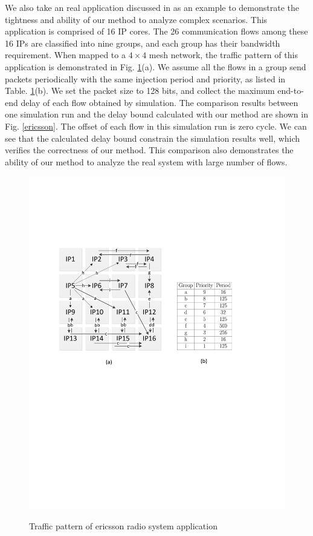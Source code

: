 \documentclass[preprint]{elsarticle}
\begin{document}
We also take an real application discussed in \cite{LuJa08}\cite{Jafari1922089} as an example to demonstrate the tightness and ability of our method to analyze complex scenarios. This application is comprised of 16 IP cores. The 26 communication flows among these 16 IPs are classified into nine groups, and each group has their bandwidth requirement. When mapped to a $4\times 4$ mesh network, the traffic pattern of this application is demonstrated in Fig. \ref{trafficpattern}(a). We assume all the flows in a group send packets periodically with the same injection period and priority, as listed in Table. \ref{trafficpattern}(b). We set the packet size to 128 bits, and collect the maximum end-to-end delay of each flow obtained by simulation. The comparison results between one simulation run and the delay bound calculated  with our method are shown in Fig. \ref{ericsson}. The offset of each flow in this simulation run is zero cycle. We can see that the calculated delay bound constrain the simulation results well, which verifies the correctness of our method. This comparison also demonstrates the ability of our method to analyze the real system with large number of flows.
\begin{figure}
  \centering
  \includegraphics[scale=0.7]{figures/trafficpattern.pdf}\\
  \caption{Traffic pattern of ericsson radio system application}\label{trafficpattern}
\end{figure}
\end{document}
